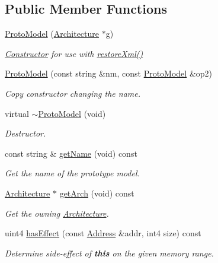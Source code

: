 \subsection*{Public Member Functions}
\begin{DoxyCompactItemize}
\item 
\mbox{\hyperlink{class_proto_model_a4ef7db884a8c5bcdea92ed7b2d6a9ac0}{Proto\+Model}} (\mbox{\hyperlink{class_architecture}{Architecture}} $\ast$g)
\begin{DoxyCompactList}\small\item\em \mbox{\hyperlink{class_constructor}{Constructor}} for use with \mbox{\hyperlink{class_proto_model_a8fe30abbc7fe1c709b1b8fe9c81803b8}{restore\+Xml()}} \end{DoxyCompactList}\item 
\mbox{\hyperlink{class_proto_model_a6385c58ce2f155d13f506c64a7a03b11}{Proto\+Model}} (const string \&nm, const \mbox{\hyperlink{class_proto_model}{Proto\+Model}} \&op2)
\begin{DoxyCompactList}\small\item\em Copy constructor changing the name. \end{DoxyCompactList}\item 
virtual \mbox{\hyperlink{class_proto_model_ae253f61258ac2ad8f165200d1737e7a3}{$\sim$\+Proto\+Model}} (void)
\begin{DoxyCompactList}\small\item\em Destructor. \end{DoxyCompactList}\item 
const string \& \mbox{\hyperlink{class_proto_model_a19f8d9a9dbc7fb8d52aa180410cddc8b}{get\+Name}} (void) const
\begin{DoxyCompactList}\small\item\em Get the name of the prototype model. \end{DoxyCompactList}\item 
\mbox{\hyperlink{class_architecture}{Architecture}} $\ast$ \mbox{\hyperlink{class_proto_model_a256b9f054603fd6d166fdf86689467bf}{get\+Arch}} (void) const
\begin{DoxyCompactList}\small\item\em Get the owning \mbox{\hyperlink{class_architecture}{Architecture}}. \end{DoxyCompactList}\item 
uint4 \mbox{\hyperlink{class_proto_model_a5bd9f07bc75fc5f2497f1d4de685a8cf}{has\+Effect}} (const \mbox{\hyperlink{class_address}{Address}} \&addr, int4 size) const
\begin{DoxyCompactList}\small\item\em Determine side-\/effect of {\bfseries{this}} on the given memory range. \end{DoxyCompactList}\item 

\end{DoxyCompactItemize}
